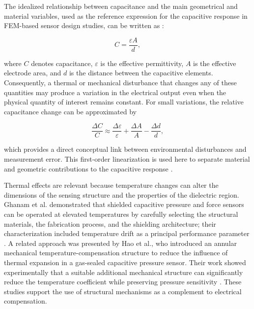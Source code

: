 \documentclass[conference]{IEEEtran}
\begin{document}
The idealized relationship between capacitance and the main geometrical and material variables, used as the reference expression for the capacitive response in FEM-based sensor design studies, can be written as \cite{Keshyagol2024,Ghanam2023}:

\begin{equation}
C=\frac{\varepsilon A}{d},
\label{eq:capacitance}
\end{equation}

where $C$ denotes capacitance, $\varepsilon$ is the effective permittivity, $A$ is the effective electrode area, and $d$ is the distance between the capacitive elements. Consequently, a thermal or mechanical disturbance that changes any of these quantities may produce a variation in the electrical output even when the physical quantity of interest remains constant. For small variations, the relative capacitance change can be approximated by

\begin{equation}
\frac{\Delta C}{C}\approx\frac{\Delta\varepsilon}{\varepsilon}+\frac{\Delta A}{A}-\frac{\Delta d}{d},
\label{eq:small_signal}
\end{equation}

which provides a direct conceptual link between environmental disturbances and measurement error. This first-order linearization is used here to separate material and geometric contributions to the capacitive response \cite{Keshyagol2024,Ghanam2023,Hao2012}.

Thermal effects are relevant because temperature changes can alter the dimensions of the sensing structure and the properties of the dielectric region. Ghanam et al. demonstrated that shielded capacitive pressure and force sensors can be operated at elevated temperatures by carefully selecting the structural materials, the fabrication process, and the shielding architecture; their characterization included temperature drift as a principal performance parameter \cite{Ghanam2023}. A related approach was presented by Hao et al., who introduced an annular mechanical temperature-compensation structure to reduce the influence of thermal expansion in a gas-sealed capacitive pressure sensor. Their work showed experimentally that a suitable additional mechanical structure can significantly reduce the temperature coefficient while preserving pressure sensitivity \cite{Hao2012}. These studies support the use of structural mechanisms as a complement to electrical compensation.
\end{document}
